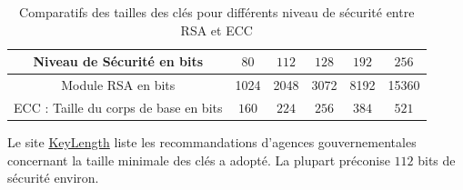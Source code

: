 {\renewcommand{\arraystretch}{1.3}
\begin{table}[h]
\centering
    \begin{tabular}{|c||c|c|c|c|c|}
        \hline
        Niveau de Sécurité en bits & $80$ & $112$ & $128$ & $192$ & $256$\\
        \hline
        Module RSA en bits & 1024 & 2048 & 3072 & 8192 & 15360 \\
        \hline
        ECC : Taille du corps de base en bits & $160$ & $224$ & $256$ & $384$ & $521$ \\
        \hline
    \end{tabular}
\caption{Comparatifs des tailles des clés pour différents niveau de sécurité entre RSA et ECC}
\label{tab:keylength}
\end{table}}
Le site \href{http://www.keylength.com}{KeyLength} liste les recommandations d'agences gouvernementales concernant la taille minimale des clés a adopté. La plupart préconise $112$ bits de sécurité environ.

